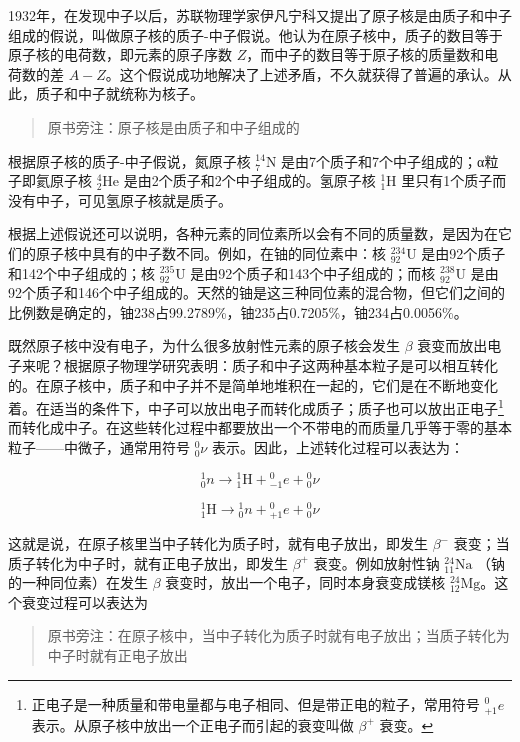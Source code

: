 1932年，在发现中子以后，苏联物理学家伊凡宁科又提出了原子核是由质子和中子组成的假说，叫做原子核的质子-中子假说。他认为在原子核中，质子的数目等于原子核的电荷数，即元素的原子序数
\(Z\)，而中子的数目等于原子核的质量数和电荷数的差
\(A - Z\)。这个假说成功地解决了上述矛盾，不久就获得了普遍的承认。从此，质子和中子就统称为核子。

\begin{quote}
原书旁注：原子核是由质子和中子组成的
\end{quote}

根据原子核的质子-中子假说，氮原子核 \({}^{14}_{7}\mathrm{N}\)
是由7个质子和7个中子组成的；α粒子即氦原子核 \({}^{4}_{2}\mathrm{He}\)
是由2个质子和2个中子组成的。氢原子核 \({}^{1}_{1}\mathrm{H}\)
里只有1个质子而没有中子，可见氢原子核就是质子。

根据上述假说还可以说明，各种元素的同位素所以会有不同的质量数，是因为在它们的原子核中具有的中子数不同。例如，在铀的同位素中：核
\({}^{234}_{92}\mathrm{U}\) 是由92个质子和142个中子组成的；核
\({}^{235}_{92}\mathrm{U}\) 是由92个质子和143个中子组成的；而核
\({}^{238}_{92}\mathrm{U}\)
是由92个质子和146个中子组成的。天然的铀是这三种同位素的混合物，但它们之间的比例数是确定的，铀238占99.2789\%，铀235占0.7205\%，铀234占0.0056\%。

既然原子核中没有电子，为什么很多放射性元素的原子核会发生 \(\beta\)
衰变而放出电子来呢？根据原子物理学研究表明：质子和中子这两种基本粒子是可以相互转化的。在原子核中，质子和中子并不是简单地堆积在一起的，它们是在不断地变化着。在适当的条件下，中子可以放出电子而转化成质子；质子也可以放出正电子\footnote{正电子是一种质量和带电量都与电子相同、但是带正电的粒子，常用符号
  \({}_{+1}^{0}e\) 表示。从原子核中放出一个正电子而引起的衰变叫做
  \(\beta^+\) 衰变。}而转化成中子。在这些转化过程中都要放出一个不带电的而质量几乎等于零的基本粒子------中微子，通常用符号
\({}_{0}^{0}\nu\) 表示。因此，上述转化过程可以表达为：

\[
{} _ {0} ^ {1} n \longrightarrow {} _ {1} ^ {1} \mathrm{H} + {} _ {-1} ^ {0} e + {} _ {0} ^ {0} \nu
\]

\[
{} _ {1} ^ {1} \mathrm{H} \longrightarrow {} _ {0} ^ {1} n + {} _ {+1} ^ {0} e + {} _ {0} ^ {0} \nu
\]

这就是说，在原子核里当中子转化为质子时，就有电子放出，即发生 \(\beta^-\)
衰变；当质子转化为中子时，就有正电子放出，即发生 \(\beta^+\)
衰变。例如放射性钠 \({}^{24}_{11}\mathrm{Na}\) （钠的一种同位素）在发生
\(\beta\) 衰变时，放出一个电子，同时本身衰变成镁核
\({}^{24}_{12}\mathrm{Mg}\)。这个衰变过程可以表达为

\begin{quote}
原书旁注：在原子核中，当中子转化为质子时就有电子放出；当质子转化为中子时就有正电子放出
\end{quote}

